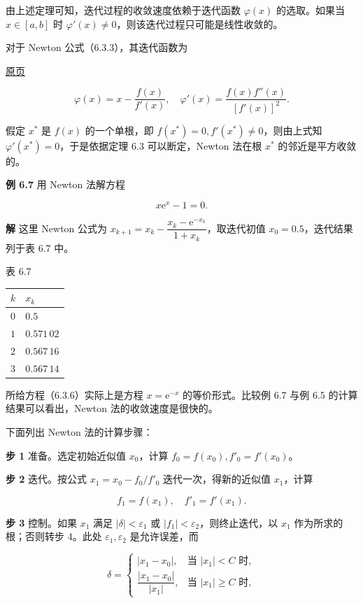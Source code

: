 \documentclass[
  10pt,
  fontset=fandol]{ctexart}
\newcounter{none} %
\begin{document}
由上述定理可知，迭代过程的收敛速度依赖于迭代函数 \(\varphi(x)\) 的选取。如果当 \(x\in[a,b]\) 时 \(\varphi'(x)\ne0\)，则该迭代过程只可能是线性收敛的。

对于 Newton 公式（6.3.3），其迭代函数为

\href{../../source-images/pdf-165.jpeg}{原页}

\[
\varphi(x)=x-\frac{f(x)}{f'(x)},\quad\varphi'(x)=\frac{f(x)f''(x)}{[f'(x)]^2}.
\]

假定 \(x^*\) 是 \(f(x)\) 的一个单根，即 \(f(x^*)=0,f'(x^*)\ne0\)，则由上式知 \(\varphi'(x^*)=0\)，于是依据定理 6.3 可以断定，Newton 法在根 \(x^*\) 的邻近是平方收敛的。

\textbf{例 6.7} 用 Newton 法解方程

\[
x\mathrm{e}^x-1=0.
\tag{6.3.6}
\]

\textbf{解} 这里 Newton 公式为 \(x_{k+1}=x_k-\dfrac{x_k-\mathrm{e}^{-x_k}}{1+x_k}\)，取迭代初值 \(x_0=0.5\)，迭代结果列于表 6.7 中。

表 6.7

{\def\LTcaptype{none} %
\begin{longtable}[]{@{}ll@{}}
\toprule\noalign{}
\(k\) & \(x_k\) \\
\midrule\noalign{}
\endhead
\bottomrule\noalign{}
\endlastfoot
\(0\) & \(0.5\) \\
\(1\) & \(0.571\,02\) \\
\(2\) & \(0.567\,16\) \\
\(3\) & \(0.567\,14\) \\
\end{longtable}
}

所给方程（6.3.6）实际上是方程 \(x=\mathrm{e}^{-x}\) 的等价形式。比较例 6.7 与例 6.5 的计算结果可以看出，Newton 法的收敛速度是很快的。

下面列出 Newton 法的计算步骤：

\textbf{步 1} 准备。选定初始近似值 \(x_0\)，计算 \(f_0=f(x_0),f'_0=f'(x_0)\)。

\textbf{步 2} 迭代。按公式 \(x_1=x_0-f_0/f'_0\) 迭代一次，得新的近似值 \(x_1\)，计算

\[
f_1=f(x_1),\quad f'_1=f'(x_1).
\]

\textbf{步 3} 控制。如果 \(x_1\) 满足 \(|\delta|<\varepsilon_1\) 或 \(|f_1|<\varepsilon_2\)，则终止迭代，以 \(x_1\) 作为所求的根；否则转步 4。此处 \(\varepsilon_1,\varepsilon_2\) 是允许误差，而

\[
\delta=\begin{cases}
|x_1-x_0|,&\text{当 }|x_1|<C\text{ 时},\\
\dfrac{|x_1-x_0|}{|x_1|},&\text{当 }|x_1|\geqslant C\text{ 时},
\end{cases}
\]
\end{document}
